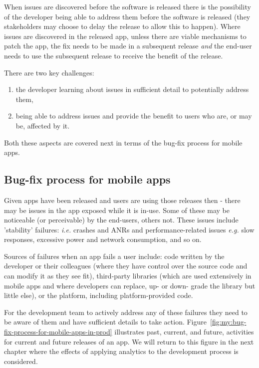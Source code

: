 When issues are discovered before the software is released there is the possibility of the developer being able to address them before the software is released (they stakeholders may choose to delay the release to allow this to happen). Where issues are discovered in the released app, unless there are viable mechanisms to patch the app, the fix needs to be made in a subsequent release \textit{and} the end-user needs to use the subsequent release to receive the benefit of the release.

There are two key challenges:
\begin{enumerate}
    \item the developer learning about issues in sufficient detail to potentially address them,
    \item being able to address issues and provide the benefit to users who are, or  may be, affected by it.
\end{enumerate}

Both these aspects are covered next in terms of the bug-fix process for mobile apps.

\subsection{Bug-fix process for mobile apps}

Given apps have been released and users are using those releases then - there may be issues in the app exposed while it is in-use. Some of these may be noticeable (or perceivable) by the end-users, others not. These issues include 'stability' failures: \textit{i.e.} crashes and ANRs and performance-related issues \textit{e.g.} slow responses, excessive power and network consumption, and so on.

Sources of failures when an app fails a user include: code written by the developer or their colleagues (where they have control over the source code and can modify it as they see fit), third-party libraries (which are used extensively in mobile apps and where developers can replace, up- or down- grade the library but little else), or the platform, including platform-provided code.

For the development team to actively address any of these failures they need to be aware of them and have sufficient details to take action. Figure~\ref{fig:my:bug-fix-process-for-mobile-apps-in-prod} illustrates past, current, and future, activities for current and future releases of an app. We will return to this figure %
in the next chapter where the effects of applying analytics to the development process is considered.

